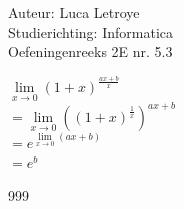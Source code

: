 \documentclass[a4paper]{article}
\begin{document}
  
\noindent \large Auteur: Luca Letroye        \\
\noindent \large Studierichting: Informatica \\
\noindent \large Oefeningenreeks 2E nr. 5.3 \\

\medskip

\normalsize


$\lim\limits_{x \rightarrow 0} \left( 1+x \right)^{\tfrac{ax+b}{x}} $\\

$ = \lim\limits_{x \rightarrow 0}\left( \left( 1+x \right)^{\tfrac{1}{x}}\right) ^{ax+b}$\\

$ = e^{\lim\limits_{x \rightarrow 0} \left( ax+b \right)} $\\

$ = e^{b} $\\






\begin{thebibliography}{999}
\end{thebibliography}
\end{document}
